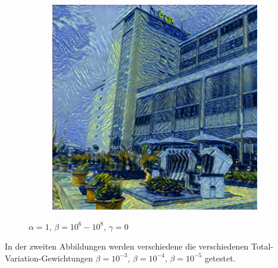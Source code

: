 \begin{figure}[H]
\begin{subfigure}[h]{0.3\textwidth}
    \end{subfigure}
    \begin{subfigure}[h]{0.3\textwidth}
        \centering
        \includegraphics[width=\textwidth]{resources/content/output/neural-style/htw-test-1-3.jpg}
    \end{subfigure}
    \caption{$ \alpha = 1 $, $ \beta = 10^{6} - 10^{8} $, $ \gamma = 0 $}
\end{figure}

In der zweiten Abbildungen werden verschiedene die verschiedenen Total-Variation-Gewichtungen $ \beta = 10^{-3} $, $ \beta = 10^{-4} $, $ \beta = 10^{-5} $ getestet.

